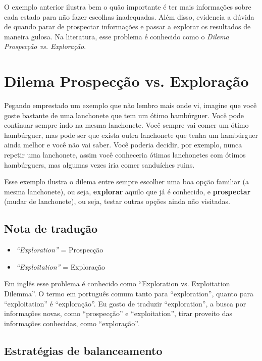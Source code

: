 \documentclass{article}
\begin{document}
            O exemplo anterior ilustra bem o quão importante é ter mais informações sobre cada estado para não fazer escolhas inadequadas. Além disso, evidencia a dúvida de quando parar de prospectar informações e passar a explorar os resultados de maneira gulosa. Na literatura, esse problema é conhecido como o \emph{Dilema Prospecção vs. Exploração}.
    
    \section{Dilema Prospecção vs. Exploração}
    
        \noindent
        Pegando emprestado um exemplo que não lembro mais onde vi, imagine que você goste bastante de uma lanchonete que tem um ótimo hambúrguer. Você pode continuar sempre indo na mesma lanchonete. Você sempre vai comer um ótimo hambúrguer, mas pode ser que exista outra lanchonete que tenha um hambúrguer ainda melhor e você não vai saber. Você poderia decidir, por exemplo, nunca repetir uma lanchonete, assim você conheceria ótimas lanchonetes com ótimos hambúrguers, mas algumas vezes iria comer sanduíches ruins.
        
        Esse exemplo ilustra o dilema entre sempre escolher uma boa opção familiar (a mesma lanchonete), ou seja, \textbf{explorar} aquilo que já é conhecido, e \textbf{prospectar} (mudar de lanchonete), ou seja, testar outras opções ainda não visitadas. 
    
        \subsection{Nota de tradução}
        
            \begin{itemize}
                \item \textit{``Exploration''} = Prospecção
                \item \textit{``Exploitation''} = Exploração
            \end{itemize}

            Em inglês esse problema é conhecido como ``Exploration vs. Exploitation Dilemma''. O termo em português comum tanto para ``exploration'', quanto para ``exploitation'' é ``exploração''. Eu gosto de traduzir ``exploration'', a busca por informações novas, como ``prospecção'' e ``exploitation'', tirar proveito das informações conhecidas, como ``exploração''.
                
        \subsection{Estratégias de balanceamento}
        
\end{document}
